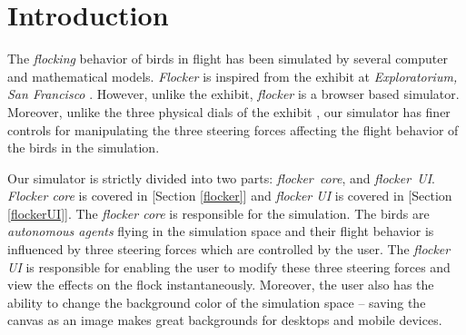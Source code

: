 \documentclass[../main]{subfiles}
\begin{document}
\section{Introduction}
\label{intro}

The {\em flocking} behavior of birds in flight has been simulated by several computer and mathematical models. {\em Flocker} is inspired from the exhibit at {\em Exploratorium, San Francisco} \cite{jillflock}. However, unlike the exhibit, {\em flocker} is a browser based simulator. Moreover, unlike the three physical dials of the exhibit \cite{jillflock}, our simulator has finer controls for manipulating the three steering forces affecting the flight behavior of the birds in the simulation.

Our simulator is strictly divided into two parts: \mbox{\em flocker core}, and \mbox{\em flocker UI}. {\em Flocker core} is covered in [Section \ref{flocker}] and {\em flocker UI} is covered in [Section \ref{flockerUI}]. The {\em flocker core} is responsible for the simulation. The birds are {\em autonomous agents} flying in the simulation space and their flight behavior is influenced by three steering forces which are controlled by the user. The {\em flocker UI} is responsible for enabling the user to modify these three steering forces and view the effects on the flock instantaneously. Moreover, the user also has the ability to change the background color of the simulation space -- saving the canvas as an image makes great backgrounds for desktops and mobile devices.
\end{document}
